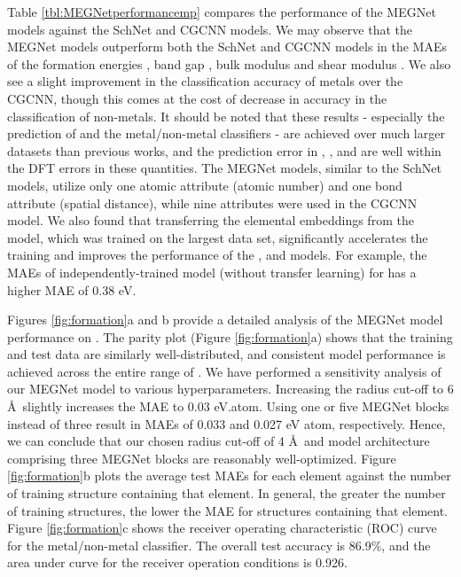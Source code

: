 \documentclass[manuscript=article]{achemso}
\begin{document}
Table \ref{tbl:MEGNetperformancemp} compares the performance of the MEGNet models against the SchNet\cite{Schutt2018} and CGCNN models\cite{Xie2017}. We may observe that the MEGNet models outperform both the SchNet and CGCNN models in the MAEs of the formation energies , band gap , bulk modulus  and shear modulus . We also see a slight improvement in the classification accuracy of metals over the CGCNN, though this comes at the cost of decrease in accuracy in the classification of non-metals. It should be noted that these results - especially the prediction of  and the metal/non-metal classifiers - are achieved over much larger datasets than previous works, and the prediction error in , ,  and  are well within the DFT errors in these quantities\cite{kirklin2015open,lany2008semiconductor, jain2011high, crowley2016resolution, de2015charting}. The MEGNet models, similar to the SchNet models, utilize only one atomic attribute (atomic number) and one bond attribute (spatial distance), while nine attributes were used in the CGCNN model. We also found that transferring the elemental embeddings from the  model, which was trained on the largest data set, significantly accelerates the training and improves the performance of the ,  and  models. For example, the MAEs of independently-trained model (without transfer learning) for  has a higher MAE of 0.38 eV. 

Figures \ref{fig:formation}a and b provide a detailed analysis of the MEGNet model performance on . The parity plot (Figure \ref{fig:formation}a) shows that the training and test data are similarly well-distributed, and consistent model performance is achieved across the entire range of . We have performed a sensitivity analysis of our MEGNet  model to various hyperparameters. Increasing the radius cut-off to 6 \AA\, slightly increases the MAE to 0.03 eV.atom. Using one or five MEGNet blocks instead of three result in MAEs of 0.033 and 0.027 eV atom, respectively. Hence, we can conclude that our chosen radius cut-off of 4 \AA\,  and model architecture comprising three MEGNet blocks are reasonably well-optimized. Figure \ref{fig:formation}b plots the average test MAEs for each element against the number of training structure containing that element. In general, the greater the number of training structures, the lower the MAE for structures containing that element.  Figure \ref{fig:formation}c shows the receiver operating characteristic (ROC) curve for the metal/non-metal classifier. The overall test accuracy is 86.9\%, and the area under curve for the receiver operation conditions is 0.926.
\end{document}

